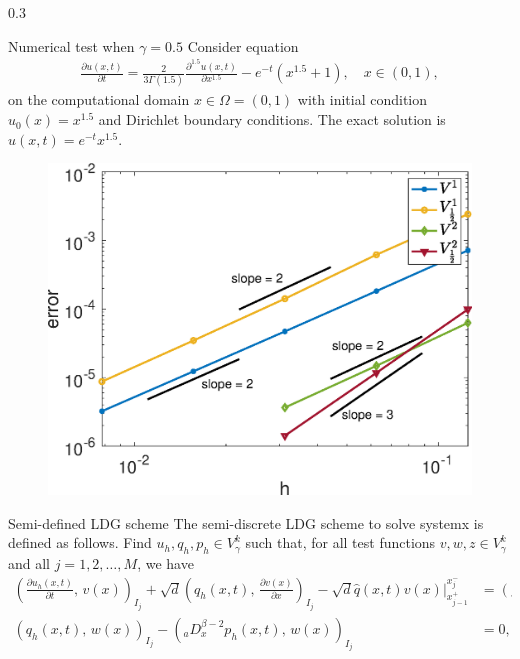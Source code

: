 \documentclass{msuposter}
\newcommand{\uh}{u_h}
\newcommand{\qh}{q_h}
\newcommand{\ph}{p_h}
\newcommand{\qhat}{\hat{q}}
\newcommand{\colwidth}{0.3\linewidth}
\begin{document}
\begin{frame}{}
\begin{columns}[t]
\begin{column}{\colwidth}
\begin{exampleblock}{Numerical test when $\gamma = 0.5$}
	Consider equation 
	\begin{equation}\label{eqn:exm1}
	\begin{aligned}
	\frac{\partial u(x,t)}{\partial t} = \frac{2 }{3\Gamma(1.5)} \frac{\partial ^{1.5} u(x,t)}{\partial x^{1.5}} - e^{-t} (x^{1.5} +1),\quad x \in (0,1),
	\end{aligned}
	\end{equation}
 on the computational domain $x\in \Omega =(0,1)$ with initial condition$u_0(x) = x^{1.5}$
	and Dirichlet boundary conditions. The exact solution is $u(x,t) = e^{-t}x^{1.5}$. 

\begin{figure}
\includegraphics[width=0.8\linewidth]{Figure1}
\end{figure}
\end{exampleblock}
\begin{block}{Semi-defined LDG scheme} 
The semi-discrete LDG scheme to solve systemx is defined as follows. 
Find $\uh, \qh, \ph \in V^k_\gamma$ such that, for all test functions $v, w, z \in V^k_\gamma$ and all $j=1,2,\dots,M$, we have
\begin{equation*}\label{eqn:Numerical Scheme}
\begin{aligned}
\left(\frac{\partial \uh(x,t)}{\partial t},\,v(x) \right)_{I_j} +\sqrt{d}\left(\qh(x,t),\,\frac{\partial v(x)}{\partial x}\right)_{I_j} - \sqrt{d}\qhat(x,t) v(x)\Bigr\rvert_{x_{j-1}^+}^{x_j^-}&=(f(x,t),\,v(x))_{I_j},\\
\left( \qh(x,t),\,w(x)\right)_{I_j} - (_{a}D_x^{\beta-2}\ph(x,t),\,w(x))_{I_j}&=0, \\

\end{aligned}
\end{equation*}
\end{block}
\end{column}
\end{columns}
\end{frame}
\end{document}
